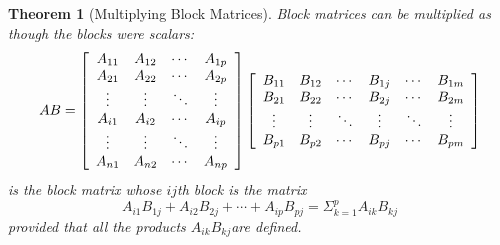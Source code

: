 \documentclass[10pt]{report}
\newtheorem{thm2}{Theorem}[section]
\begin{document}
\begin{thm2}[Multiplying Block Matrices]
Block matrices can be multiplied as though the blocks were scalars:
$$AB = \left[ \begin{array}{c c c c}
A_{11} & A_{12} & \cdots & A_{1p}\\
A_{21} & A_{22} & \cdots & A_{2p}\\
\vdots & \vdots & \ddots & \vdots\\
A_{i1} & A_{i2} & \cdots & A_{ip}\\
\vdots & \vdots & \ddots & \vdots\\
A_{n1} & A_{n2} & \cdots & A_{np}
\end{array}\right]\left[ \begin{array}{c c c c c c}
B_{11} & B_{12} & \cdots & B_{1j} & \cdots & B_{1m}\\
B_{21} & B_{22} & \cdots & B_{2j} & \cdots & B_{2m}\\
\vdots & \vdots & \ddots & \vdots & \ddots & \vdots\\
B_{p1} & B_{p2} & \cdots & B_{pj} & \cdots & B_{pm}
\end{array}\right]$$
is the block matrix whose $ij$th block is the matrix
$$A_{i1}B_{1j} + A_{i2}B_{2j} + \cdots + A_{ip}B_{pj} = \Sigma_{k=1}^p A_{ik}B_{kj}$$
provided that all the products $A_{ik}B_{kj}$are defined.
\end{thm2}
\end{document}
